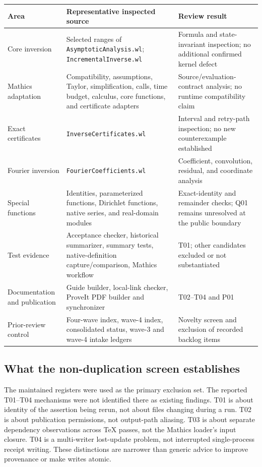 \documentclass[11pt,letterpaper]{article}
\newcommand{\code}[1]{\nolinkurl{#1}}
\begin{document}
\begin{longtable}{@{}p{1.15in}p{3.5in}p{1.62in}@{}}
\toprule
Area & Representative inspected source & Review result\\
\midrule\endhead
Core inversion & Selected ranges of \code{AsymptoticAnalysis.wl}; \code{IncrementalInverse.wl} & Formula and state-invariant inspection; no additional confirmed kernel defect\\
Mathics adaptation & Compatibility, assumptions, Taylor, simplification, calls, time budget, calculus, core functions, and certificate adapters & Source/evaluation-contract analysis; no runtime compatibility claim\\
Exact certificates & \code{InverseCertificates.wl} & Interval and retry-path inspection; no new counterexample established\\
Fourier inversion & \code{FourierCoefficients.wl} & Coefficient, convolution, residual, and coordinate analysis\\
Special functions & Identities, parameterized functions, Dirichlet functions, native series, and real-domain modules & Exact-identity and remainder checks; Q01 remains unresolved at the public boundary\\
Test evidence & Acceptance checker, historical summarizer, summary tests, native-definition capture/comparison, Mathics workflow & T01; other candidates excluded or not substantiated\\
Documentation and publication & Guide builder, local-link checker, ProveIt PDF builder and synchronizer & T02--T04 and P01\\
Prior-review control & Four-wave index, wave-4 index, consolidated status, wave-3 and wave-4 intake ledgers & Novelty screen and exclusion of recorded backlog items\\
\bottomrule
\end{longtable}

\subsection{What the non-duplication screen establishes}

The maintained registers were used as the primary exclusion set. The reported
T01--T04 mechanisms were not identified there as existing findings. T01 is about
identity of the assertion being rerun, not about files changing during a run.
T02 is about publication permissions, not output-path aliasing. T03 is about
separate dependency observations across TeX passes, not the Mathics loader's
input closure. T04 is a multi-writer lost-update problem, not interrupted
single-process receipt writing. These distinctions are narrower than generic
advice to improve provenance or make writes atomic.\cite{status,intake3,intake4}
\end{document}
